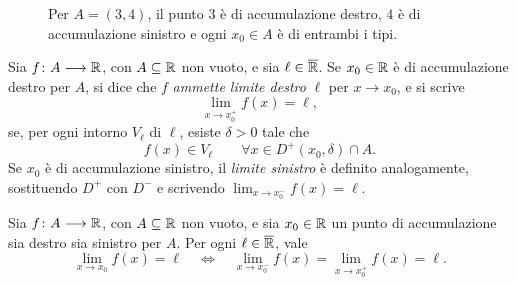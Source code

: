 \begin{figure}[htbp]
  \centering
  
  \caption{Per \(A=(3,4)\), il punto \(3\) è di
  accumulazione destro, \(4\) è di accumulazione
  sinistro e ogni \(x_0\in A\) è di entrambi i tipi.}
  \label{fig:lez14-accumulazione-unilaterale}
\end{figure}

\begin{definition}
\label{def:lez14-limiti-unilateri}
Sia \(f\colon A\longrightarrow\mathbb{R}\), con
\(A\subseteq\mathbb{R}\) non vuoto, e sia \(\ell\in\overline{\mathbb{R}}\).
Se \(x_0\in\mathbb{R}\) è di accumulazione destro per \(A\),
si dice che \(f\) \emph{ammette limite destro} \(\ell\)
per \(x\to x_0\), e si scrive
\[
  \lim_{x\to x_0^+}f(x)=\ell,
\]
se, per ogni intorno \(V_\ell\) di \(\ell\), esiste
\(\delta>0\) tale che
\[
  f(x)\in V_\ell
  \qquad\forall x\in D^+(x_0,\delta)\cap A.
\]
Se \(x_0\) è di accumulazione sinistro, il
\emph{limite sinistro} è definito analogamente,
sostituendo \(D^+\) con \(D^-\) e scrivendo
\(\lim_{x\to x_0^-}f(x)=\ell\).
\end{definition}

\clearpage

\begin{theorem}
\label{thm:lez14-limite-unilateri}
Sia \(f\colon A\longrightarrow\mathbb{R}\), con
\(A\subseteq\mathbb{R}\) non vuoto, e sia \(x_0\in\mathbb{R}\) un punto
di accumulazione sia destro sia sinistro per \(A\).
Per ogni \(\ell\in\overline{\mathbb{R}}\), vale
\[
  \lim_{x\to x_0}f(x)=\ell
  \quad\Longleftrightarrow\quad
  \lim_{x\to x_0^-}f(x)
  =\lim_{x\to x_0^+}f(x)=\ell.
\]
\end{theorem}

